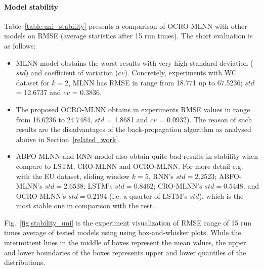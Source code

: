 \documentclass[review,3p,authoryear]{elsarticle}
\begin{document}
{\paragraph{\textbf{Model stability}} 
Table~\ref{table:uni_stability} presents a comparison of OCRO-MLNN with other models on RMSE (average statistics after 15 run times). The short evaluation is as follows:
\begin{itemize}

\item MLNN model obstains the worst results with very high standard deviation ($std$) and coefficient of variation ($cv$). Concretely, experiments with WC dataset for $k = 2$, MLNN has 
	RMSE in range from 18.771 up to 67.5236; 
	$std$ = 12.6737 and 
	$cv$ = 0.3836.

\item The proposed OCRO-MLNN obtains in experiments 
	RMSE values in range from 16.6236 to 24.7484, 
	$std$ = 1.8681 and 
	$cv$ = 0.0932). 
The reason of such results are the disadvantages of the back-propagation algorithm as analysed aboive in Section~\ref{related_work}. 

\item ABFO-MLNN and RNN model also obtain quite bad results in stability when compare to LSTM, CRO-MLNN and OCRO-MLNN. 
For more detail e.g. with the EU dataset, sliding window $k = 5$, 
	RNN's $std = 2.2523$;
	ABFO-MLNN's $std = 2.6538$;
	LSTM's $std = 0.8462$;
	CRO-MLNN's $std = 0.5448$; and
	OCRO-MLNN's $std = 0.2194$ (i.e. a quarter of LSTM's $std$), which is the most stable one in comparison with the rest. 
\end{itemize}

Fig.~\ref{fig:stability_uni} is the experiment visualization of RMSE range of 15 run times average of tested models using using box-and-whisker plots. While the intermittent lines in the middle of boxes represent the mean values, the upper and lower boundaries of the boxes represents upper and lower quantiles of the distributions. 


}
\end{document}
